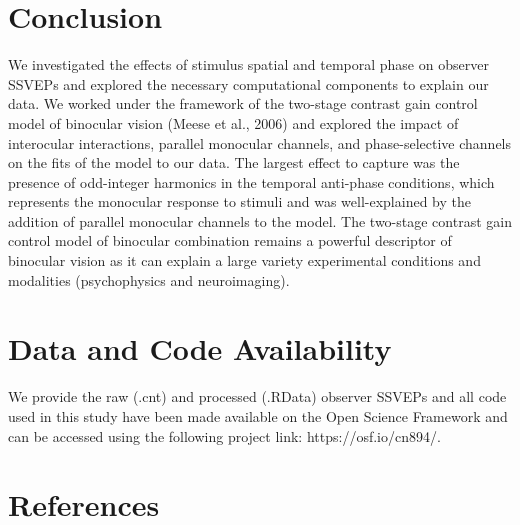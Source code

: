 \documentclass[
  12pt,
]{article}
\begin{document}
\section{Conclusion}\label{conclusion}

We investigated the effects of stimulus spatial and temporal phase on
observer SSVEPs and explored the necessary computational components to
explain our data. We worked under the framework of the two-stage
contrast gain control model of binocular vision (Meese et al., 2006) and
explored the impact of interocular interactions, parallel monocular
channels, and phase-selective channels on the fits of the model to our
data. The largest effect to capture was the presence of odd-integer
harmonics in the temporal anti-phase conditions, which represents the
monocular response to stimuli and was well-explained by the addition of
parallel monocular channels to the model. The two-stage contrast gain
control model of binocular combination remains a powerful descriptor of
binocular vision as it can explain a large variety experimental
conditions and modalities (psychophysics and neuroimaging).

\section{Data and Code Availability}\label{data-and-code-availability}

We provide the raw (.cnt) and processed (.RData) observer SSVEPs and all
code used in this study have been made available on the Open Science
Framework and can be accessed using the following project link:
https://osf.io/cn894/.

\section*{References}\label{references}
\end{document}
